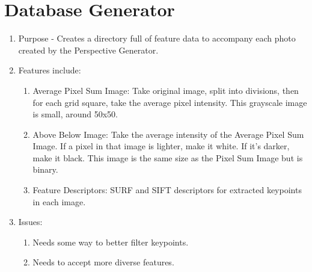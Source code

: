\documentclass[a4paper,11pt]{article}
\begin{document}
\section{Database Generator}
\begin{enumerate}
    \item Purpose - Creates a directory full of feature data to accompany each photo created by the Perspective Generator. 
    \item Features include:
    \begin{enumerate}
        \item Average Pixel Sum Image: Take original image, split into divisions, then for each grid square, take the average pixel intensity. This grayscale image is small, around 50x50.
        \item Above Below Image: Take the average intensity of the Average Pixel Sum Image. If a pixel in that image is lighter, make it white. If it's darker, make it black. This image is the same size as the Pixel Sum Image but is binary.
        \item Feature Descriptors: SURF and SIFT descriptors for extracted keypoints in each image.
    \end{enumerate}
    \item Issues:
    \begin{enumerate}
        \item Needs some way to better filter keypoints.
        \item Needs to accept more diverse features.
    \end{enumerate}
\end{enumerate}

  

  
\end{document}
